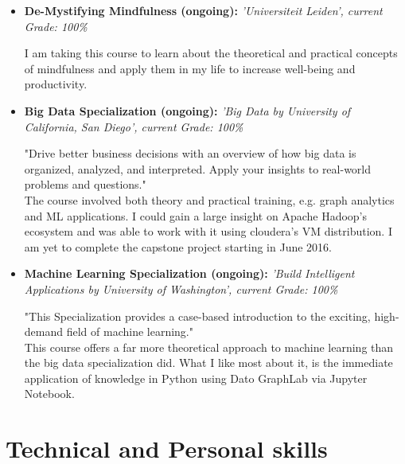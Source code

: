 \documentclass[11pt,a4paper,sans]{moderncv}        %
\begin{document}
\begin{itemize}

\item{\textbf{De-Mystifying Mindfulness (ongoing):} \textit{'Universiteit Leiden', current Grade: 100\%}

\vspace{2pt}

\small{I am taking this course to learn about the theoretical and practical concepts of mindfulness and apply them in my life to increase well-being and productivity.}}

\item{\textbf{Big Data Specialization (ongoing):} \textit{'Big Data by University of California, San Diego', current Grade: 100\%}

\vspace{2pt}

\small{"Drive better business decisions with an overview of how big data is organized, analyzed, and interpreted. Apply your insights to real-world problems and questions."\\
The course involved both theory and practical training, e.g. graph analytics and ML applications. I could gain a large insight on Apache Hadoop's ecosystem
and was able to work with it using cloudera's VM distribution. I am yet to complete the capstone project starting in June 2016.}}

\item{\textbf{Machine Learning Specialization (ongoing):} \textit{'Build Intelligent Applications by University of Washington', current Grade: 100\%}

\vspace{2pt}

\small{"This Specialization provides a case-based introduction to the exciting, high-demand field of machine learning."\\
This course offers a far more theoretical approach to machine learning than the big data specialization did. What I like most about it, is the immediate 
application of knowledge in Python using Dato GraphLab via Jupyter Notebook.}}

\end{itemize}

\section{Technical and Personal skills}

\vspace{6pt}
\end{document}
